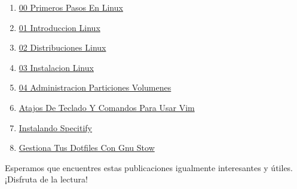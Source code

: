 \documentclass[
  doc,
  floatsintext,
  longtable,
  a4paper,
  nolmodern,
  notxfonts,
  notimes,
  12pt,
  colorlinks=true,linkcolor=blue,citecolor=blue,urlcolor=blue]{apa7}
\begin{document}
\begin{enumerate}
{  De Git Y Github}
\item
  \href{https://chaska-x.netlify.app/operating-system/2023-05-02-00-primeros-pasos-en-linux/index.pdf}{}
  \href{https://chaska-x.netlify.app/operating-system/2023-05-02-00-primeros-pasos-en-linux}{00
  Primeros Pasos En Linux}
\item
  \href{https://chaska-x.netlify.app/operating-system/2023-06-17-01-introduccion-linux/index.pdf}{}
  \href{https://chaska-x.netlify.app/operating-system/2023-06-17-01-introduccion-linux}{01
  Introduccion Linux}
\item
  \href{https://chaska-x.netlify.app/operating-system/2023-06-18-02-distribuciones-linux/index.pdf}{}
  \href{https://chaska-x.netlify.app/operating-system/2023-06-18-02-distribuciones-linux}{02
  Distribuciones Linux}
\item
  \href{https://chaska-x.netlify.app/operating-system/2023-06-19-03-instalacion-linux/index.pdf}{}
  \href{https://chaska-x.netlify.app/operating-system/2023-06-19-03-instalacion-linux}{03
  Instalacion Linux}
\item
  \href{https://chaska-x.netlify.app/operating-system/2023-06-20-04-administracion-particiones-volumenes/index.pdf}{}
  \href{https://chaska-x.netlify.app/operating-system/2023-06-20-04-administracion-particiones-volumenes}{04
  Administracion Particiones Volumenes}
\item
  \href{https://chaska-x.netlify.app/operating-system/2023-07-01-atajos-de-teclado-y-comandos-para-usar-vim/index.pdf}{}
  \href{https://chaska-x.netlify.app/operating-system/2023-07-01-atajos-de-teclado-y-comandos-para-usar-vim}{Atajos
  De Teclado Y Comandos Para Usar Vim}
\item
  \href{https://chaska-x.netlify.app/operating-system/2024-07-15-instalando-specitify/index.pdf}{}
  \href{https://chaska-x.netlify.app/operating-system/2024-07-15-instalando-specitify}{Instalando
  Specitify}
\item
  \href{https://chaska-x.netlify.app/operating-system/2025-07-10-gestiona-tus-dotfiles-con-gnu-stow/index.pdf}{}
  \href{https://chaska-x.netlify.app/operating-system/2025-07-10-gestiona-tus-dotfiles-con-gnu-stow}{Gestiona
  Tus Dotfiles Con Gnu Stow}
\end{enumerate}

Esperamos que encuentres estas publicaciones igualmente interesantes y
útiles. ¡Disfruta de la lectura!
\end{document}
